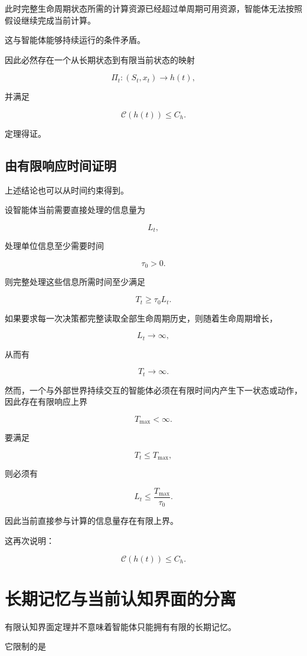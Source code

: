此时完整生命周期状态所需的计算资源已经超过单周期可用资源，智能体无法按照假设继续完成当前计算。

这与智能体能够持续运行的条件矛盾。

因此必然存在一个从长期状态到有限当前状态的映射

\[
\Pi_t:
(S_t,x_t)
\rightarrow
h(t),
\]

并满足

\[
\mathcal{C}(h(t))
\leq
C_h.
\]

定理得证。


\subsection{由有限响应时间证明}

上述结论也可以从时间约束得到。

设智能体当前需要直接处理的信息量为

\[
L_t,
\]

处理单位信息至少需要时间

\[
\tau_0>0.
\]

则完整处理这些信息所需时间至少满足

\[
T_t
\geq
\tau_0 L_t.
\]

如果要求每一次决策都完整读取全部生命周期历史，则随着生命周期增长，

\[
L_t
\rightarrow
\infty,
\]

从而有

\[
T_t
\rightarrow
\infty.
\]

然而，一个与外部世界持续交互的智能体必须在有限时间内产生下一状态或动作，因此存在有限响应上界

\[
T_{\max}<\infty.
\]

要满足

\[
T_t
\leq
T_{\max},
\]

则必须有

\[
L_t
\leq
\frac{T_{\max}}{\tau_0}.
\]

因此当前直接参与计算的信息量存在有限上界。

这再次说明：

\[
\boxed{
\mathcal{C}(h(t))
\leq
C_h.
}
\]


\section{长期记忆与当前认知界面的分离}

有限认知界面定理并不意味着智能体只能拥有有限的长期记忆。

它限制的是

